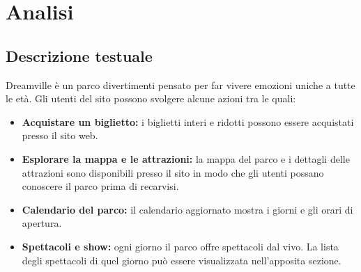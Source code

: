 \section{Analisi}
\subsection{Descrizione testuale}

Dreamville è un parco divertimenti pensato per far vivere emozioni uniche a tutte le età.
Gli utenti del sito possono svolgere alcune azioni tra le quali:
\begin{itemize}
    \item \textbf{Acquistare un biglietto:} i biglietti interi e ridotti possono essere acquistati presso il sito web.
    \item \textbf{Esplorare la mappa e le attrazioni:} la mappa del parco e i dettagli delle attrazioni sono disponibili presso il sito in modo che gli utenti possano conoscere il parco prima di recarvisi.
    \item \textbf{Calendario del parco:} il calendario aggiornato mostra i giorni e gli orari di apertura.
    \item \textbf{Spettacoli e show:} ogni giorno il parco offre spettacoli dal vivo. La lista degli spettacoli di quel giorno può essere visualizzata nell'apposita sezione.
\end{itemize}
